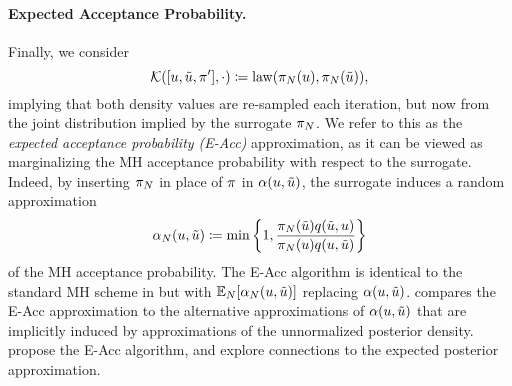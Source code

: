 \documentclass[12pt]{article}
\begin{document}
\paragraph{Expected Acceptance Probability.}
Finally, we consider
\begin{equation}
\postSampleKernel([\Par, \propPar, \postDens^\prime], \cdot)
\Def \mathrm{law}(\postEm[\Ndesign](\Par), \postEm[\Ndesign](\propPar)),
\end{equation}
implying that both density values are re-sampled each iteration, but now from
the joint distribution implied by the surrogate $\postEm[\Ndesign]$. 
We refer to this as the \textit{expected acceptance probability (E-Acc)} approximation,
as it can be viewed as marginalizing the MH acceptance probability with respect
to the surrogate. Indeed, by inserting $\postEm[\Ndesign]$
in place of $\postDens$ in $\accProbMH(\Par, \propPar)$, the surrogate induces a random 
approximation
\begin{equation}
\accProbMHEm[\Ndesign](\Par, \propPar) 
\Def \min\left\{1, \frac{\postEm[\Ndesign](\propPar)\propDens(\propPar, \Par)}{\postEm[\Ndesign](\Par) \propDens(\Par, \propPar)} \right\}
\label{eq:MH-prob-surrogate}
\end{equation}
of the MH acceptance probability. The E-Acc algorithm is identical to the standard 
MH scheme in  but with $\E_{\Ndesign}[\accProbMHEm[\Ndesign](\Par, \propPar)]$
replacing $\accProbMH(\Par, \propPar)$.  compares the E-Acc 
approximation to the alternative approximations of $\accProbMH(\Par, \propPar)$ that are implicitly 
induced by approximations of the unnormalized posterior density. 
\citet{surrogateNoisyMCMC} propose the E-Acc algorithm, 
and explore connections to the expected posterior approximation.
\end{document}
